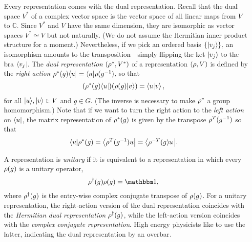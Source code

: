 Every representation comes with the dual representation. Recall that the dual space $V^*$ of a complex vector space is the vector space of all linear maps from $V$ to $\mathbb{C}$. Since $V^*$ and $V$ have the same dimension, they are isomorphic as vector spaces $V^* \simeq V$ but not naturally. (We do not assume the Hermitian inner product structure for a moment.) Nevertheless, if we pick an ordered basis $\{ {\left\vert{v_j}\right\rangle} \}$, an isomorphism amounts to the transposition---simply flipping the ket ${\left\vert{v_j}\right\rangle}$ to the bra ${\left\langle{v_j}\right\vert}$. The \emph{dual representation} $(\rho^*,V^*)$ of a representation $(\rho,V)$ is defined by the \emph{right action} $\rho^*(g) {\left\langle{u}\right\vert} = {\left\langle{u}\right\vert} \rho(g^{-1})$, so that
\begin{align}
( \rho^*(g) {\left\langle{u}\right\vert}) (\rho(g) {\left\vert{v}\right\rangle}) &= \braket{u|v},
\end{align}
for all ${\left\vert{u}\right\rangle},{\left\vert{v}\right\rangle} \in V$ and $g \in G$.
(The inverse is necessary to make $\rho^*$ a group homomorphism.) Note that if we want to turn the right action to the \emph{left action} on ${\left\langle{u}\right\vert}$, the matrix representation of $\rho^*(g)$ is given by the transpose $\rho^T(g^{-1})$ so that 
\begin{align}
	{\left\langle{u}\right\vert}\rho^*(g) &= {\left\langle{\rho^T(g^{-1})u}\right\vert} = {\left\langle{\rho^{-T}(g)u}\right\vert}.
\end{align}

A representation is \emph{unitary} if it is equivalent to a representation in which every $\rho(g)$ is a unitary operator,
\begin{align}
\rep\dgg (g) \rep(g) &= \id,
\end{align}
where $\rho^{\dagger} (g)$ is the entry-wise complex conjugate transpose of $\rho(g)$.
For a unitary representation, the right-action version of the dual representation coincides with the \emph{Hermitian dual representation} $\rho^{\dagger} (g)$, while the left-action version coincides with the \emph{complex conjugate representation}. High energy physicists like to use the latter, indicating the dual representation by an overbar.


\usetikzlibrary{shapes.geometric}

